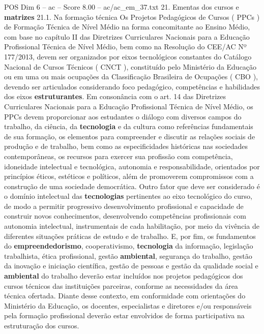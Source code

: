 \begin{textsample}{POS Dim 6 – ac – Score 8.00 – ac/ac\_em\_37.txt}  \label{ex:f6_pos_157}
21.
Ementas dos cursos e \textbf{matrizes} 21.1.
Na formação técnica Os Projetos Pedagógicos de Cursos ( PPCs ) de Formação Técnica de Nível Médio na forma concomitante ao Ensino Médio, com base no capítulo II das Diretrizes Curriculares Nacionais para a Educação Profissional Técnica de Nível Médio, bem como na Resolução do CEE/AC Nº 177/2013, devem ser organizados por eixos tecnológicos constantes do Catálogo Nacional de Cursos Técnicos ( CNCT ), constituído pelo Ministério da Educação ou em uma ou mais ocupações da Classificação Brasileira de Ocupações ( CBO ), devendo ser articulados considerando foco pedagógico, competências e habilidades dos eixos \textbf{estruturantes}.
Em consonância com o art. 14 das Diretrizes Curriculares Nacionais para a Educação Profissional Técnica de Nível Médio, os PPCs devem proporcionar aos estudantes o diálogo com diversos campos do trabalho, da ciência, da \textbf{tecnologia} e da cultura como referências fundamentais de sua formação, os elementos para compreender e discutir as relações sociais de produção e de trabalho, bem como as especificidades históricas nas sociedades contemporâneas, os recursos para exercer sua profissão com competência, idoneidade intelectual e tecnológica, autonomia e responsabilidade, orientados por princípios éticos, estéticos e políticos, além de promoverem compromissos com a construção de uma sociedade democrática.
Outro fator que deve ser considerado é o domínio intelectual das \textbf{tecnologias} pertinentes ao eixo tecnológico do curso, de modo a permitir progressivo desenvolvimento profissional e capacidade de construir novos conhecimentos, desenvolvendo competências profissionais com autonomia intelectual, instrumentais de cada habilitação, por meio da vivência de diferentes situações práticas de estudo e de trabalho.
E, por fim, os fundamentos do \textbf{empreendedorismo}, cooperativismo, \textbf{tecnologia} da informação, legislação trabalhista, ética profissional, gestão \textbf{ambiental}, segurança do trabalho, gestão da inovação e iniciação científica, gestão de pessoas e gestão da qualidade social e \textbf{ambiental} do trabalho deverão estar incluídos nos projetos pedagógicos dos cursos técnicos das instituições parceiras, conforme as necessidades da área técnica ofertada.
Diante desse contexto, em conformidade com orientações do Ministério da Educação, os docentes, especialistas e diretores e/ou responsáveis pela formação profissional deverão estar envolvidos de forma participativa na estruturação dos cursos.

\end{textsample}
